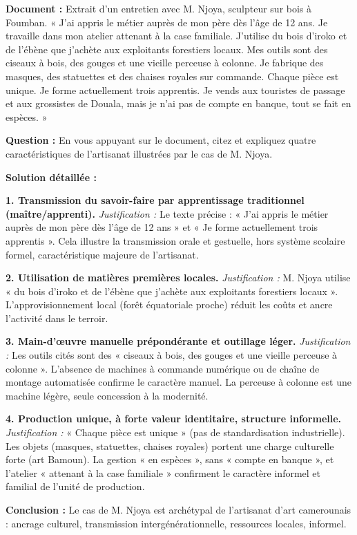 \documentclass[11pt]{article}
\newcommand{\cle}[1]{{\popxbold\color{popdark}#1}}
\begin{document}
\begin{exoresolu}
\textbf{Document :} Extrait d'un entretien avec M. Njoya, sculpteur sur bois à Foumban. 
« J'ai appris le métier auprès de mon père dès l'âge de 12 ans. Je travaille dans mon atelier attenant à la case familiale. J'utilise du bois d'iroko et de l'ébène que j'achète aux exploitants forestiers locaux. Mes outils sont des ciseaux à bois, des gouges et une vieille perceuse à colonne. Je fabrique des masques, des statuettes et des chaises royales sur commande. Chaque pièce est unique. Je forme actuellement trois apprentis. Je vends aux touristes de passage et aux grossistes de Douala, mais je n'ai pas de compte en banque, tout se fait en espèces. »

\textbf{Question :} En vous appuyant sur le document, citez et expliquez quatre caractéristiques de l'artisanat illustrées par le cas de M. Njoya.

\tcblower
\textbf{Solution détaillée :}

\textbf{1. Transmission du savoir-faire par apprentissage traditionnel (maître/apprenti).}
\textit{Justification :} Le texte précise : « J'ai appris le métier auprès de mon père dès l'âge de 12 ans » et « Je forme actuellement trois apprentis ». Cela illustre la transmission orale et gestuelle, hors système scolaire formel, caractéristique majeure de l'artisanat.

\textbf{2. Utilisation de matières premières locales.}
\textit{Justification :} M. Njoya utilise « du bois d'iroko et de l'ébène que j'achète aux exploitants forestiers locaux ». L'approvisionnement local (forêt équatoriale proche) réduit les coûts et ancre l'activité dans le terroir.

\textbf{3. Main-d'œuvre manuelle prépondérante et outillage léger.}
\textit{Justification :} Les outils cités sont des « ciseaux à bois, des gouges et une vieille perceuse à colonne ». L'absence de machines à commande numérique ou de chaîne de montage automatisée confirme le caractère manuel. La perceuse à colonne est une machine légère, seule concession à la modernité.

\textbf{4. Production unique, à forte valeur identitaire, structure informelle.}
\textit{Justification :} « Chaque pièce est unique » (pas de standardisation industrielle). Les objets (masques, statuettes, chaises royales) portent une charge culturelle forte (art Bamoun). La gestion « en espèces », sans « compte en banque », et l'atelier « attenant à la case familiale » confirment le caractère \cle{informel} et \cle{familial} de l'unité de production.

\textbf{Conclusion :} Le cas de M. Njoya est archétypal de l'\cle{artisanat d'art} camerounais : ancrage culturel, transmission intergénérationnelle, ressources locales, informel.
\end{exoresolu}
\end{document}
